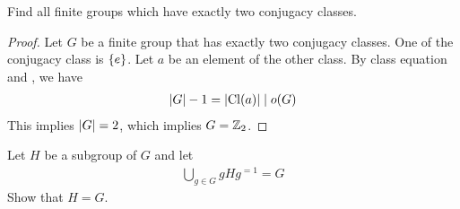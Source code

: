 \documentclass{report}
\begin{document}
\begin{question}{}{}
Find all finite groups which have exactly two conjugacy classes. 
\end{question}
\begin{proof}
Let $G$ be a finite group that has exactly two conjugacy classes. One of the conjugacy class is $\left\{ e \right\}$. Let $a$ be an element of the other class. By class equation and , we have
\begin{align*}
 \left|G\right|-1 =  \left|\operatorname{Cl}(a)\right|  \mid  o(G)
\end{align*}
This implies $\left|G\right|=2$, which implies $G=\mathbb{Z}_2$. 
\end{proof}
\begin{question}{}{}
Let $H$ be a subgroup of  $G$ and let 
 \begin{align*}
\bigcup_{ g \in G} gHg^{=1}=G
\end{align*}
Show that $H=G$. 
\end{question}
\end{document}
